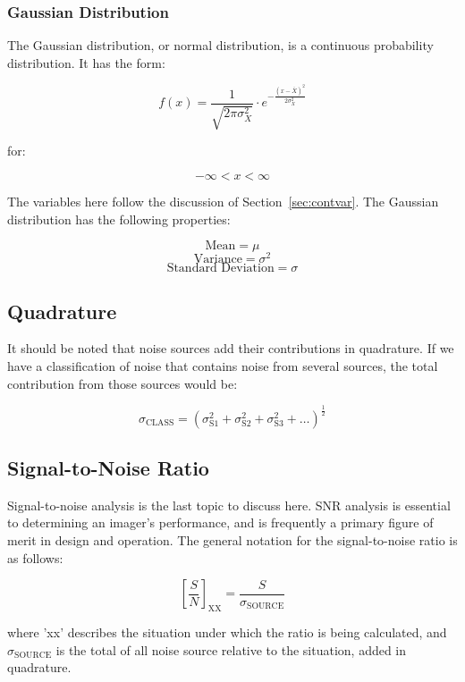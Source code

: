 \documentclass[10pt]{article}
\begin{document}
\subsubsection{Gaussian Distribution}

The Gaussian distribution, or normal distribution, is a continuous probability distribution. It has the form:

$$f(x) = \frac{1}{\sqrt{2 \pi \sigma^2_X}} \cdot e^{- \frac{(x-\bar{X})^2}{2 \sigma ^2_X}}$$

\noindent for:

\vspace{-4mm}

$$ -\infty < x < \infty $$

\vspace{2mm}
\noindent The variables here follow the discussion of Section~\ref{sec:contvar}. The Gaussian distribution has the following properties:

$$ \text{Mean} = \mu $$
$$ \text{Variance} = \sigma^2 $$
$$ \text{Standard Deviation} = \sigma $$

\subsection{Quadrature}

It should be noted that noise sources add their contributions in quadrature. If we have a classification of noise that contains noise from several sources, the total contribution from those sources would be:

$$ \sigma_{\text{CLASS}} = (\sigma^2_{\text{S1}} + \sigma^2_{\text{S2}} + \sigma^2_{\text{S3}} + \ldots )^{\frac{1}{2}}$$

\subsection{Signal-to-Noise Ratio}

Signal-to-noise analysis is the last topic to discuss here. SNR analysis is essential to determining an imager's performance, and is frequently a primary figure of merit in design and operation. The general notation for the signal-to-noise ratio is as follows:

$$ \left [ \frac{S}{N} \right ] _{\text{XX}} = \frac{S}{\sigma_{\text{SOURCE}}} $$ 

\vspace{2mm}

\noindent where 'xx' describes the situation under which the ratio is being calculated, and $ \sigma_{\text{SOURCE}} $ is the total of all noise source relative to the situation, added in quadrature.
\end{document}
